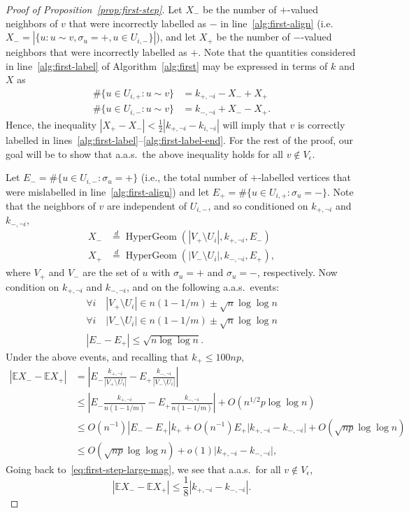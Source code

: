 \documentclass[EJP,final]{ejpecp}
\newcommand{\E}{\mathbb{E}}
\newcommand{\1}[1]{\mathbbm{1}_{\{#1\}}}
\DeclareMathOperator{\HyperGeom}{HyperGeom}
\newcommand{\eqD}{\stackrel{d}{=}}
\newcommand{\noti}{\lnot i}
\begin{document}
\begin{proof}[Proof of Proposition~\ref{prop:first-step}]
 Let $X_-$ be the number of $+$-valued neighbors of $v$ that were incorrectly
 labelled as $-$ in line~\ref{alg:first-align}
 (i.e. $X_- = |\{u : u \sim v, \sigma_u = +, u \in U_{i,-}\}|$), and let $X_+$ be the number
 of $-$-valued neighbors that were incorrectly labelled as $+$.
 Note that the quantities considered in line~\ref{alg:first-label}
 of Algorithm~\ref{alg:first} may be expressed in terms of
 $k$ and $X$ as
 \begin{align*}
   \#\{u \in U_{i,+}: u \sim v\} &= k_{+,\noti} - X_- + X_+ \\
   \#\{u \in U_{i,-}: u \sim v\} &= k_{-,\noti} + X_- - X_+.
 \end{align*}
 Hence, the inequality $|X_+ - X_-| < \frac 12 |k_{+,\noti} - k_{i,\noti}|$
 will imply that $v$ is correctly labelled in
 lines~\ref{alg:first-label}--\ref{alg:first-label-end}.
 For the rest of the proof, our goal will be to show that a.a.s.\ the
 above inequality holds for all $v \not \in V_\epsilon$.

 Let $E_- = \# \{u \in U_{i,-} : \sigma_u = +\}$
 (i.e., the total number of $+$-labelled vertices
 that were mislabelled in line~\ref{alg:first-align}) and let
 $E_+ = \# \{u \in U_{i,+} : \sigma_u = -\}$.
 Note that the neighbors of $v$ are independent of $U_{i,-}$, and so
 conditioned on $k_{+,\noti}$ and $k_{-,\noti}$,
 \begin{align*}
  X_- &\eqD \HyperGeom(|V_+ \setminus U_i|, k_{+,\noti}, E_-) \\
  X_+ &\eqD \HyperGeom(|V_- \setminus U_i|, k_{-,\noti}, E_+),
 \end{align*}
 where $V_+$ and $V_-$ are the set of $u$ with $\sigma_u = +$
 and $\sigma_u = -$, respectively.
 Now condition on $k_{+,\noti}$ and $k_{-,\noti}$,
 and on the following a.a.s.\ events:
 \begin{gather*}
   \forall i \quad |V_+ \setminus U_i| \in n(1-1/m) \pm \sqrt{n} \log \log n \\
   \forall i \quad |V_- \setminus U_i| \in n(1-1/m) \pm \sqrt{n} \log \log n \\
   |E_- - E_+| \le \sqrt {n \log \log n}.
 \end{gather*}
 Under the above events, and recalling that $k_+ \le 100np$,
 \begin{align*}
  |\E X_- - \E X_+|
  &= \left|
  E_- \frac{k_{+,\noti}}{|V_+ \setminus U_i|}
  - E_+ \frac{k_{-,\noti}}{|V_- \setminus U_i|}
  \right| \\
  &\le \left|
  E_- \frac{k_{+,\noti}}{n(1-1/m)}
  - E_+ \frac{k_{-,\noti}}{n(1-1/m)}
  \right|
  + O(n^{1/2} p \log \log n) \\
  &\le O(n^{-1}) |E_- - E_+| k_+
     + O(n^{-1}) E_+ \big|k_{+,\noti} - k_{-,\noti}\big|
     + O(\sqrt{np} \log \log n) \\
  &\le O(\sqrt{np} \log \log n)
     + o(1) \big|k_{+,\noti} - k_{-,\noti}\big|,
 \end{align*}
 Going back to~\eqref{eq:first-step-large-mag},
 we see that a.a.s.\ for all $v \not \in V_\epsilon$,
 \[
   |\E X_- - \E X_+| \le \frac{1}{8} |k_{+,\noti} - k_{-,\noti}|.
 \]


\end{proof}
\end{document}
